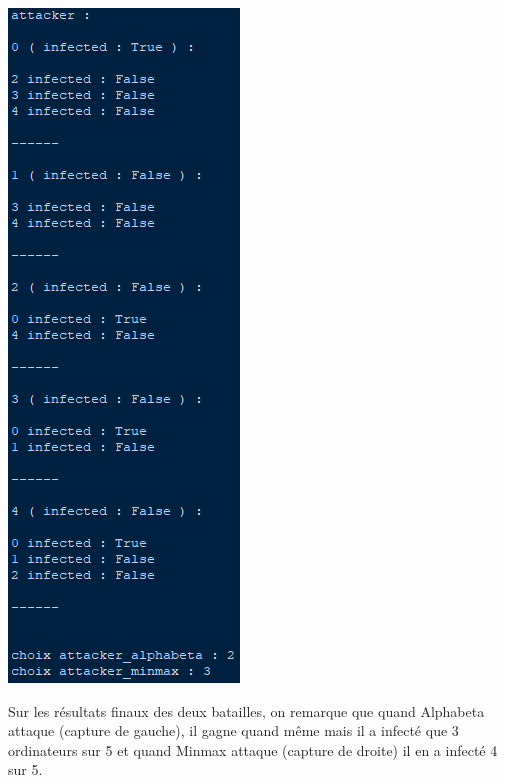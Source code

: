 \documentclass[a4paper,12pt]{article} %
\begin{document}
\begin{center}
\includegraphics[scale=0.7]{images/Capture6.PNG}
\end{center}

Sur les résultats finaux des deux batailles, on remarque que quand Alphabeta attaque (capture de gauche), il gagne quand même mais il a infecté que 3 ordinateurs sur 5 et quand Minmax attaque (capture de droite) il en a infecté 4 sur 5.
\end{document}
